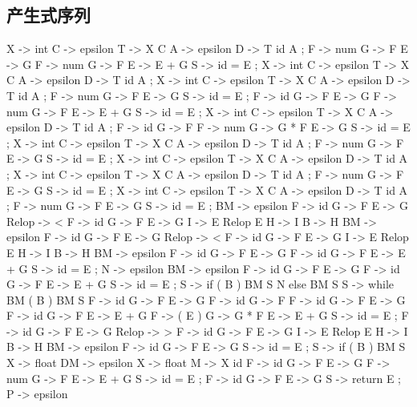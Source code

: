 \documentclass{ML}
\begin{document}
\subsection{产生式序列}
\begin{multicols}{2}
\begin{textcode}
    X -> int
    C -> epsilon
    T -> X C
    A -> epsilon
    D -> T id A ;
    F -> num
    G -> F
    E -> G
    F -> num
    G -> F
    E -> E + G
    S -> id = E ;
    X -> int
    C -> epsilon
    T -> X C
    A -> epsilon
    D -> T id A ;
    X -> int
    C -> epsilon
    T -> X C
    A -> epsilon
    D -> T id A ;
    F -> num
    G -> F
    E -> G
    S -> id = E ;
    F -> id
    G -> F
    E -> G
    F -> num
    G -> F
    E -> E + G
    S -> id = E ;
    X -> int
    C -> epsilon
    T -> X C
    A -> epsilon
    D -> T id A ;
    F -> id
    G -> F
    F -> num
    G -> G * F
    E -> G
    S -> id = E ;
    X -> int
    C -> epsilon
    T -> X C
    A -> epsilon
    D -> T id A ;
    F -> num
    G -> F
    E -> G
    S -> id = E ;
    X -> int
    C -> epsilon
    T -> X C
    A -> epsilon
    D -> T id A ;
    X -> int
    C -> epsilon
    T -> X C
    A -> epsilon
    D -> T id A ;
    F -> num
    G -> F
    E -> G
    S -> id = E ;
    X -> int
    C -> epsilon
    T -> X C
    A -> epsilon
    D -> T id A ;
    F -> num
    G -> F
    E -> G
    S -> id = E ;
    BM -> epsilon
    F -> id
    G -> F
    E -> G
    Relop -> <
    F -> id
    G -> F
    E -> G
    I -> E Relop E
    H -> I
    B -> H
    BM -> epsilon
    F -> id
    G -> F
    E -> G
    Relop -> <
    F -> id
    G -> F
    E -> G
    I -> E Relop E
    H -> I
    B -> H
    BM -> epsilon
    F -> id
    G -> F
    E -> G
    F -> id
    G -> F
    E -> E + G
    S -> id = E ;
    N -> epsilon
    BM -> epsilon
    F -> id
    G -> F
    E -> G
    F -> id
    G -> F
    E -> E + G
    S -> id = E ;
    S -> if ( B ) BM S N else BM S
    S -> while BM ( B ) BM S
    F -> id
    G -> F
    E -> G
    F -> id
    G -> F
    F -> id
    G -> F
    E -> G
    F -> id
    G -> F
    E -> E + G
    F -> ( E )
    G -> G * F
    E -> E + G
    S -> id = E ;
    F -> id
    G -> F
    E -> G
    Relop -> >
    F -> id
    G -> F
    E -> G
    I -> E Relop E
    H -> I
    B -> H
    BM -> epsilon
    F -> id
    G -> F
    E -> G
    S -> id = E ;
    S -> if ( B ) BM S
    X -> float
    DM -> epsilon
    X -> float
    M -> X id
    F -> id
    G -> F
    E -> G
    F -> num
    G -> F
    E -> E + G
    S -> id = E ;
    F -> id
    G -> F
    E -> G
    S -> return E ;
    P -> epsilon

\end{textcode}
\end{multicols}
\end{document}
